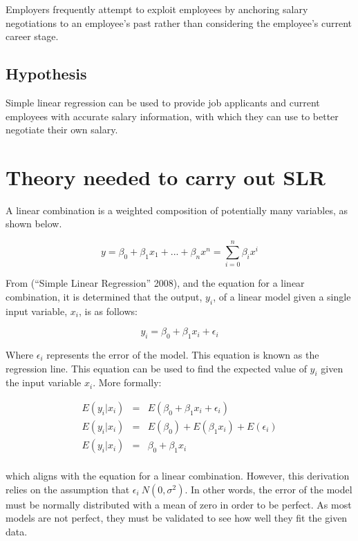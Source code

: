 \documentclass[]{article}
\begin{document}
Employers frequently attempt to exploit employees by anchoring salary
negotiations to an employee's past rather than considering the
employee's current career stage.

\hypertarget{hypothesis}{%
\subsection{Hypothesis}\label{hypothesis}}

Simple linear regression can be used to provide job applicants and
current employees with accurate salary information, with which they can
use to better negotiate their own salary.

\hypertarget{theory-needed-to-carry-out-slr}{%
\section{Theory needed to carry out
SLR}\label{theory-needed-to-carry-out-slr}}

A linear combination is a weighted composition of potentially many
variables, as shown below.

\[
y = \beta_0 + \beta_1x_1 + ...+\beta_nx^n = \sum_{i=0}^n{\beta_ix^i}
\]

From (``Simple Linear Regression'' 2008), and the equation for a linear
combination, it is determined that the output, \(y_i\), of a linear
model given a single input variable, \(x_i\), is as follows:

\[
y_i = \beta_0 + \beta_1x_i + \epsilon_i
\]

Where \(\epsilon_i\) represents the error of the model. This equation is
known as the regression line. This equation can be used to find the
expected value of \(y_i\) given the input variable \(x_i\). More
formally:

\[
\begin{eqnarray}
E(y_i | x_i) &=& E(\beta_0 + \beta_1x_i + \epsilon_i)\\
E(y_i | x_i) &=& E(\beta_0) + E(\beta_1x_i) + E(\epsilon_i)\\
E(y_i | x_i) &=& \beta_0 + \beta_1x_i\\
\end{eqnarray}
\]

which aligns with the equation for a linear combination. However, this
derivation relies on the assumption that
\(\epsilon_i ~ N(0, \sigma^2)\). In other words, the error of the model
must be normally distributed with a mean of zero in order to be perfect.
As most models are not perfect, they must be validated to see how well
they fit the given data.
\end{document}
